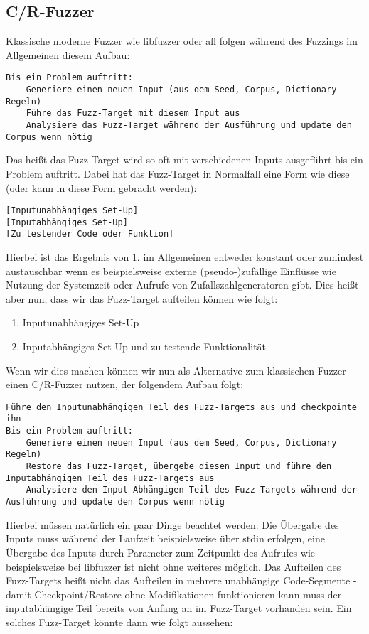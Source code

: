 \documentclass[a4paper]{article}
\begin{document}
\subsection{C/R-Fuzzer}
Klassische moderne Fuzzer wie libfuzzer oder afl folgen während des Fuzzings im Allgemeinen diesem Aufbau:
\begin{lstlisting}[caption=Struktur Klassischer Non-C/R-Fuzzer]
Bis ein Problem auftritt:
    Generiere einen neuen Input (aus dem Seed, Corpus, Dictionary Regeln)
    Führe das Fuzz-Target mit diesem Input aus
    Analysiere das Fuzz-Target während der Ausführung und update den Corpus wenn nötig
\end{lstlisting}
Das heißt das Fuzz-Target wird so oft mit verschiedenen Inputs ausgeführt bis ein Problem auftritt. Dabei hat das Fuzz-Target in Normalfall eine Form wie diese (oder kann in diese Form gebracht werden):
\begin{lstlisting}[caption=Struktur Klassisches Fuzztarget]
[Inputunabhängiges Set-Up]
[Inputabhängiges Set-Up]
[Zu testender Code oder Funktion]
\end{lstlisting}
Hierbei ist das Ergebnis von 1. im Allgemeinen entweder konstant oder zumindest austauschbar wenn es beispielsweise externe (pseudo-)zufällige Einflüsse wie Nutzung der Systemzeit oder Aufrufe von Zufallszahlgeneratoren gibt. Dies heißt aber nun, dass wir das Fuzz-Target aufteilen können wie folgt:
\begin{enumerate}
    \item Inputunabhängiges Set-Up
    \item Inputabhängiges Set-Up und zu testende Funktionalität
\end{enumerate}
Wenn wir dies machen können wir nun als Alternative zum klassischen Fuzzer einen C/R-Fuzzer nutzen, der folgendem Aufbau folgt:
\begin{lstlisting}[caption=Struktur einfacher C/R-Fuzzer]
Führe den Inputunabhängigen Teil des Fuzz-Targets aus und checkpointe ihn
Bis ein Problem auftritt:
    Generiere einen neuen Input (aus dem Seed, Corpus, Dictionary Regeln)
    Restore das Fuzz-Target, übergebe diesen Input und führe den Inputabhängigen Teil des Fuzz-Targets aus
    Analysiere den Input-Abhängigen Teil des Fuzz-Targets während der Ausführung und update den Corpus wenn nötig
\end{lstlisting}
Hierbei müssen natürlich ein paar Dinge beachtet werden: Die Übergabe des Inputs muss während der Laufzeit beispielsweise über stdin erfolgen, eine Übergabe des Inputs durch Parameter zum Zeitpunkt des Aufrufes wie beispielsweise bei libfuzzer ist nicht ohne weiteres möglich. Das Aufteilen des Fuzz-Targets heißt nicht das Aufteilen in mehrere unabhängige Code-Segmente - damit Checkpoint/Restore ohne Modifikationen funktionieren kann muss der inputabhängige Teil bereits von Anfang an im Fuzz-Target vorhanden sein. Ein solches Fuzz-Target könnte dann wie folgt aussehen:
\end{document}
